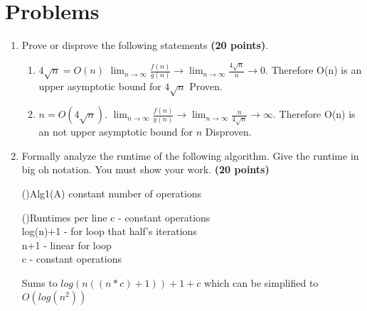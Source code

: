 \documentclass[11pt]{amsart}
\begin{document}
\section*{Problems}

\begin{enumerate}

\item Prove or disprove the following statements \textbf{(20 points)}.
\begin{enumerate}
\item $4\sqrt{n} = O(n)$
\subitem $\lim_{n \to \infty}\frac{f(n)}{g(n)}\rightarrow \lim_{n \to \infty}\frac{4\sqrt{n}}{n} \rightarrow 0.$ Therefore O(n) is an upper asymptotic bound for $4\sqrt{n}$ Proven.\\
\item $n = O(4\sqrt{n})$.
\subitem $\lim_{n \to \infty}\frac{f(n)}{g(n)}\rightarrow \lim_{n \to \infty}\frac{n}{4\sqrt{n}} \rightarrow \infty.$ Therefore O(n) is an not upper asymptotic bound for $n$ Disproven.\\
\end{enumerate}




\bigskip

\item Formally analyze the runtime of the following algorithm. Give the runtime in big oh notation. You must show your work. \textbf{(20 points)}

\smallskip

\begin{algorithm}[H]
\Fn(){Alg1(A)}{
\SetAlgoLined
\SetNoFillComment
\DontPrintSemicolon
	constant number of operations \\
}
\end{algorithm}

\begin{algorithm}[H]
	\Fn(){Runtimes per line}{
	\SetAlgoLined
	\SetNoFillComment
	\DontPrintSemicolon
		c - constant operations\\
		log(n)+1 - for loop that half's iterations\\	
		n+1 - linear for loop\\
		c - constant operations
	}
\end{algorithm}
Sums to $log(n((n*c)+1))+1+c$ which can be simplified to $O(log(n^2))$
\bigskip


\end{enumerate}
\end{document}
